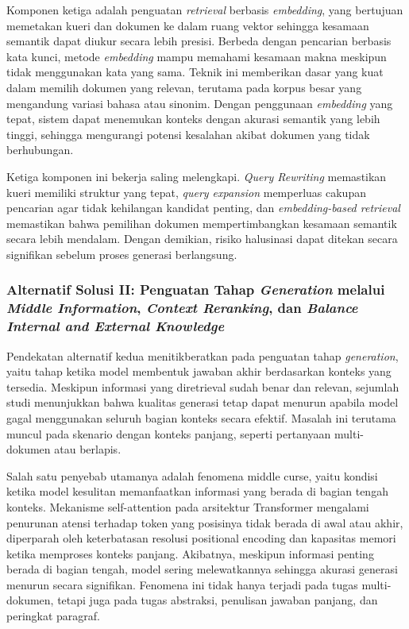Komponen ketiga adalah penguatan \textit{retrieval} berbasis \textit{embedding}, yang bertujuan memetakan kueri dan dokumen ke dalam ruang vektor sehingga kesamaan semantik dapat diukur secara lebih presisi. Berbeda dengan pencarian berbasis kata kunci, metode \textit{embedding} mampu memahami kesamaan makna meskipun tidak menggunakan kata yang sama. Teknik ini memberikan dasar yang kuat dalam memilih dokumen yang relevan, terutama pada korpus besar yang mengandung variasi bahasa atau sinonim. Dengan penggunaan \textit{embedding} yang tepat, sistem dapat menemukan konteks dengan akurasi semantik yang lebih tinggi, sehingga mengurangi potensi kesalahan akibat dokumen yang tidak berhubungan.

Ketiga komponen ini bekerja saling melengkapi. \textit{Query Rewriting} memastikan kueri memiliki struktur yang tepat, \textit{query expansion} memperluas cakupan pencarian agar tidak kehilangan kandidat penting, dan \textit{embedding-based retrieval} memastikan bahwa pemilihan dokumen mempertimbangkan kesamaan semantik secara lebih mendalam. Dengan demikian, risiko halusinasi dapat ditekan secara signifikan sebelum proses generasi berlangsung.


\subsubsection{Alternatif Solusi II: Penguatan Tahap \textit{Generation} melalui \textit{Middle Information}, \textit{Context Reranking}, dan \textit{Balance Internal and External Knowledge}}

Pendekatan alternatif kedua menitikberatkan pada penguatan tahap \textit{generation}, yaitu tahap ketika model membentuk jawaban akhir berdasarkan konteks yang tersedia. Meskipun informasi yang diretrieval sudah benar dan relevan, sejumlah studi menunjukkan bahwa kualitas generasi tetap dapat menurun apabila model gagal menggunakan seluruh bagian konteks secara efektif. Masalah ini terutama muncul pada skenario dengan konteks panjang, seperti pertanyaan multi-dokumen atau berlapis.

Salah satu penyebab utamanya adalah fenomena middle curse, yaitu kondisi ketika model kesulitan memanfaatkan informasi yang berada di bagian tengah konteks. Mekanisme self-attention pada arsitektur Transformer mengalami penurunan atensi terhadap token yang posisinya tidak berada di awal atau akhir, diperparah oleh keterbatasan resolusi positional encoding dan kapasitas memori ketika memproses konteks panjang. Akibatnya, meskipun informasi penting berada di bagian tengah, model sering melewatkannya sehingga akurasi generasi menurun secara signifikan. Fenomena ini tidak hanya terjadi pada tugas multi-dokumen, tetapi juga pada tugas abstraksi, penulisan jawaban panjang, dan peringkat paragraf.

